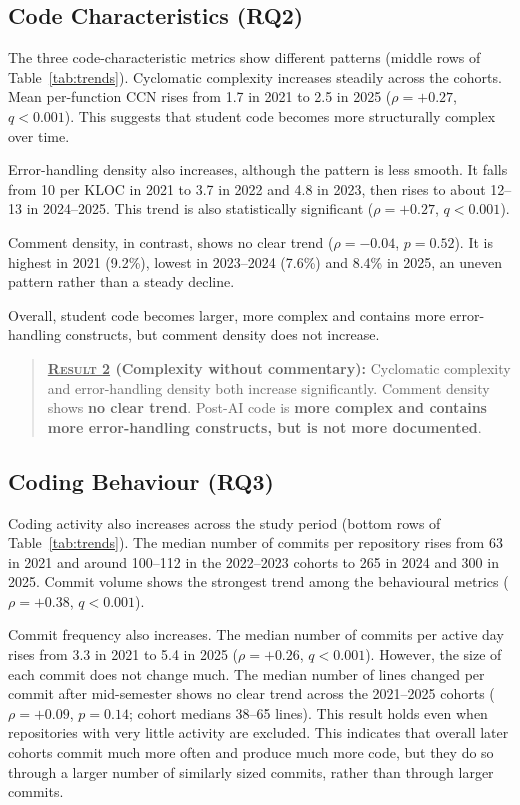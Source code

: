 \documentclass[sigconf,authorversion]{acmart}
\newcommand{\todo}[1]{#1}
\begin{document}
\subsection{Code Characteristics (RQ2)}

The three code-characteristic metrics show different patterns (middle rows of Table~\ref{tab:trends}). Cyclomatic complexity increases steadily across the cohorts. Mean per-function CCN rises from 1.7 in 2021 to 2.5 in 2025 ($\rho=+0.27$, $q<0.001$). This suggests that student code becomes more structurally complex over time.

Error-handling density also increases, although the pattern is less smooth. It falls from 10 per KLOC in 2021 to 3.7 in 2022 and 4.8 in 2023, then rises to about 12--13 in 2024--2025. This trend is also statistically significant ($\rho = +0.27$, $q < 0.001$).

\todo{Comment density, in contrast, shows no clear trend ($\rho = -0.04$, $p = 0.52$). It is highest in 2021 (9.2\%), lowest in 2023--2024 (7.6\%) and 8.4\% in 2025, an uneven pattern rather than a steady decline.}

Overall, student code becomes larger, more complex and contains more error-handling constructs, but comment density does not increase.

\begin{quote}
\textbf{\textsc{\underline{Result 2}} (Complexity without commentary):}
Cyclomatic complexity and error-handling density both increase significantly. Comment density shows \textbf{no clear trend}. Post-AI code is \textbf{more complex and contains more error-handling constructs, but is not more documented}.
\end{quote}

\subsection{Coding Behaviour (RQ3)}

Coding activity also increases across the study period (bottom rows of Table~\ref{tab:trends}). The median number of commits per repository rises from 63 in 2021 and around 100--112 in the 2022--2023 cohorts to 265 in 2024 and 300 in 2025. Commit volume shows the strongest trend among the behavioural metrics ($\rho=+0.38$, $q<0.001$).

Commit frequency also increases. The median number of commits per active day rises from 3.3 in 2021 to 5.4 in 2025 ($\rho=+0.26$, $q<0.001$).
However, the size of each commit does not change much. The median number of lines changed per commit after mid-semester shows no clear trend across the 2021--2025 cohorts ($\rho=+0.09$, $p=0.14$; cohort medians 38--65 lines). This result holds even when repositories with very little activity are excluded.
This indicates that overall later cohorts commit much more often and produce much more code, but they do so through a larger number of similarly sized commits, rather than through larger commits.
\end{document}
